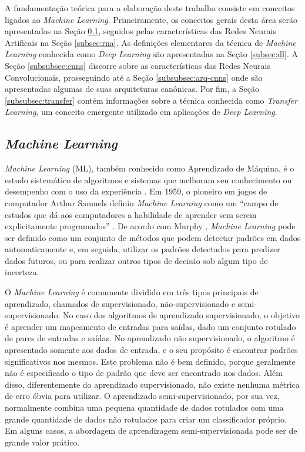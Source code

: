 A fundamentação teórica para a elaboração deste trabalho consiste em conceitos ligados ao \emph{Machine Learning}. Primeiramente, os conceitos gerais desta área serão apresentados na Seção \ref{subsec:ml}, seguidos pelas características das Redes Neurais Artificais na Seção \ref{subsec:rna}. As definições elementares da técnica de \emph{Machine Learning} conhecida como \emph{Deep Learning} são apresentadas na Seção \ref{subsec:dl}. A Seção \ref{subsubsec:cnns} discorre sobre as características das Redes Neurais Convolucionais, prosseguindo até a Seção \ref{subsubsec:arq-cnns} onde são apresentadas algumas de suas arquiteturas canônicas. Por fim, a Seção \ref{subsubsec:transfer} contém informações sobre a técnica conhecida como \emph{Transfer Learning}, um conceito emergente utilizado em aplicações de \emph{Deep Learning}.


\subsection{\emph{Machine Learning}}
\label{subsec:ml}

\emph{Machine Learning} (ML), também conhecido como Aprendizado de Máquina, é o estudo sistemático de algoritmos e sistemas que melhoram seu conhecimento ou desempenho com o uso da experiência \cite{flach}. Em 1959, o pioneiro em jogos de computador Arthur Samuels definiu \emph{Machine Learning} como um ``campo de estudos que dá aos computadores a habilidade de aprender sem serem explicitamente programados'' \cite{simon}. De acordo com Murphy \cite{murphy} , \emph{Machine Learning} pode ser definido como um conjunto de métodos que podem detectar padrões em dados automaticamente e, em seguida, utilizar os padrões detectados para predizer dados futuros, ou para realizar outros tipos de decisão sob algum tipo de incerteza.

O \emph{Machine Learning} é comumente dividido em três tipos principais de aprendizado, chamados de supervisionado, não-supervisionado e semi-supervisionado. No caso dos algoritmos de aprendizado supervisionado, o objetivo é aprender um mapeamento de entradas para saídas, dado um conjunto rotulado de pares de entradas e saídas. No aprendizado não supervisionado, o algoritmo é apresentado somente aos dados de entrada, e o seu propósito é encontrar padrões significativos nos mesmos. Este problema não é bem definido, porque geralmente não é especificado o tipo de padrão que deve ser encontrado nos dados. Além disso, diferentemente do aprendizado supervisionado, não existe nenhuma métrica de erro óbvia para utilizar. O aprendizado semi-supervisionado, por sua vez, normalmente combina uma pequena quantidade de dados rotulados com uma grande quantidade de dados não rotulados para criar um classificador próprio. Em alguns casos, a abordagem de aprendizagem semi-supervisionada pode ser de grande valor prático. \cite{khan}

